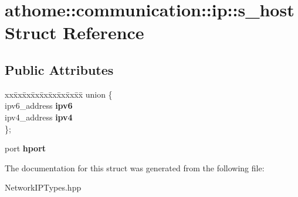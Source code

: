\hypertarget{structathome_1_1communication_1_1ip_1_1s__host}{}\section{athome\+:\+:communication\+:\+:ip\+:\+:s\+\_\+host Struct Reference}
\label{structathome_1_1communication_1_1ip_1_1s__host}
\subsection*{Public Attributes}
\begin{DoxyCompactItemize}
\item 
\mbox{\label{structathome_1_1communication_1_1ip_1_1s__host_a729beda2149b1c34039edbcfc794ab96}} 
\begin{tabbing}
xx\=xx\=xx\=xx\=xx\=xx\=xx\=xx\=xx\=\kill
union \{\\
\>ipv6\_address {\bfseries ipv6}\\
\>ipv4\_address {\bfseries ipv4}\\
\}; \\

\end{tabbing}\item 
\mbox{\label{structathome_1_1communication_1_1ip_1_1s__host_a676f8f8134a3ef8bb3363c71488d1da2}} 
port {\bfseries hport}
\end{DoxyCompactItemize}


The documentation for this struct was generated from the following file\+:\begin{DoxyCompactItemize}
\item 
Network\+I\+P\+Types.\+hpp\end{DoxyCompactItemize}
